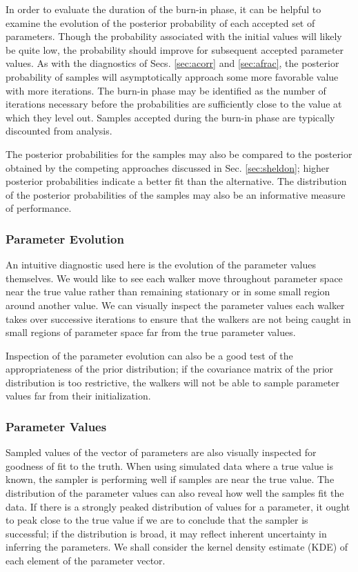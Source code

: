 \documentclass[preprint]{aastex}
\begin{document}
In order to evaluate the duration of the burn-in phase, it can be helpful to examine the evolution of the posterior probability of each accepted set of parameters.  Though the probability associated with the initial values will likely be quite low, the probability should improve for subsequent accepted parameter values.  As with the diagnostics of Secs. \ref{sec:acorr} and \ref{sec:afrac}, the posterior probability of samples will asymptotically approach some more favorable value with more iterations.  The burn-in phase may be identified as the number of iterations necessary before the probabilities are sufficiently close to the value at which they level out.  Samples accepted during the burn-in phase are typically discounted from analysis.  

The posterior probabilities for the samples may also be compared to the posterior obtained by the competing approaches discussed in Sec. \ref{sec:sheldon}; higher posterior probabilities indicate a better fit than the alternative.  The distribution of the posterior probabilities of the samples may also be an informative measure of performance.

\clearpage
\subsubsection{Parameter Evolution}
\label{sec:params}

An intuitive diagnostic used here is the evolution of the parameter values themselves.  We would like to see each walker move throughout parameter space near the true value rather than remaining stationary or in some small region around another value.  We can visually inspect the parameter values each walker takes over successive iterations to ensure that the walkers are not being caught in small regions of parameter space far from the true parameter values.  

Inspection of the parameter evolution can also be a good test of the appropriateness of the prior distribution; if the covariance matrix of the prior distribution is too restrictive, the walkers will not be able to sample parameter values far from their initialization.  

\clearpage
\subsubsection{Parameter Values}
\label{sec:samps}

Sampled values of the vector of parameters are also visually inspected for goodness of fit to the truth.  When using simulated data where a true value is known, the sampler is performing well if samples are near the true value.  The distribution of the parameter values can also reveal how well the samples fit the data.  If there is a strongly peaked distribution of values for a parameter, it ought to peak close to the true value if we are to conclude that the sampler is successful; if the distribution is broad, it may reflect inherent uncertainty in inferring the parameters.  We shall consider the kernel density estimate (KDE) of each element of the parameter vector.
\end{document}
